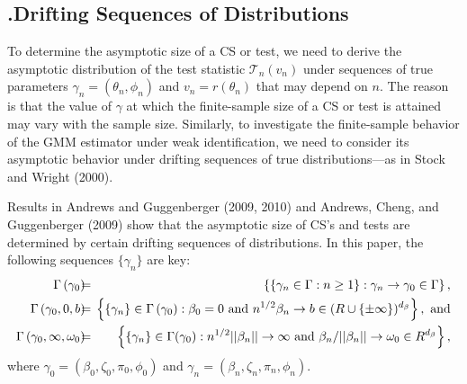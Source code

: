 \documentclass[12pt,thmsb,titlepage,final,oneside,letterpaper]{article}
\begin{document}
\subsection{\hspace{-0.23in}\textbf{.}\hspace{0.18in}Drifting Sequences of
Distributions\label{Drifting Seqs of Distns}}

\hspace{0.25in}To determine the asymptotic size of a CS or test, we need to
derive the asymptotic distribution of the test statistic $\mathcal{T}%
_{n}(v_{n})$ under sequences of true parameters $\gamma _{n}=(\theta
_{n},\phi _{n})$ and $v_{n}=r(\theta _{n})$ that may depend on $n.$ The
reason is that the value of $\gamma $ at which the finite-sample size of a
CS or test is attained may vary with the sample size. Similarly, to
investigate the finite-sample behavior of the GMM estimator under weak
identification, we need to consider its asymptotic behavior under drifting
sequences of true distributions---as in Stock and Wright (2000).

Results in Andrews and Guggenberger (2009, 2010) and Andrews, Cheng, and
Guggenberger (2009) show that the asymptotic size of CS's and tests are
determined by certain drifting sequences of distributions. In this paper,
the following sequences $\{\gamma _{n}\}$ are key: 
\begin{eqnarray}
\Gamma \left( \gamma _{0}\right) \hspace{-0.08in} &=&\hspace{-0.08in}\left\{
\{\gamma _{n}\in \Gamma :n\geq 1\}:\gamma _{n}\rightarrow \gamma _{0}\in
\Gamma \right\} ,  \label{Seq's of Gamma Par's} \\
\Gamma \left( \gamma _{0},0,b\right) \hspace{-0.08in} &=&\hspace{-0.08in}%
\left\{ \{\gamma _{n}\}\in \Gamma \left( \gamma _{0}\right) :\beta _{0}=0%
\text{ and }n^{1/2}\beta _{n}\rightarrow b\in (R\cup \left\{ \pm \infty
\right\} )^{d_{\beta }}\right\} ,\text{ and}  \notag \\
\Gamma \left( \gamma _{0},\infty ,\omega _{0}\right) \hspace{-0.08in} &=&%
\hspace{-0.08in}\left\{ \{\gamma _{n}\}\in \Gamma (\gamma
_{0}):n^{1/2}||\beta _{n}||\rightarrow \infty \text{ and }\beta _{n}/||\beta
_{n}||\rightarrow \omega _{0}\in R^{d_{\beta }}\right\} ,  \notag
\end{eqnarray}%
where $\gamma _{0}=(\beta _{0},\zeta _{0},\pi _{0},\phi _{0})$ and $\gamma
_{n}=(\beta _{n},\zeta _{n},\pi _{n},\phi _{n}).$
\end{document}

